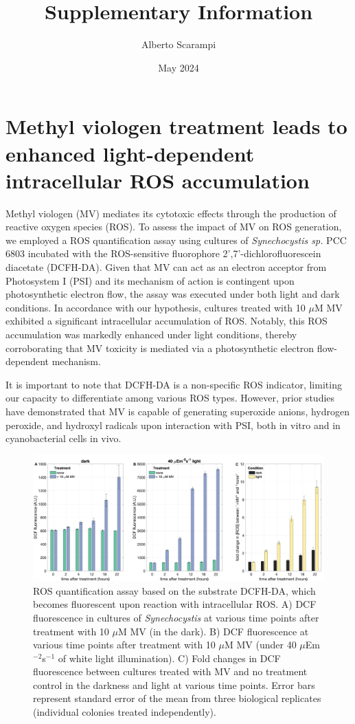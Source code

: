 \documentclass[12pt]{article}
\title{Supplementary Information}
\author{Alberto Scarampi}
\date{May 2024}
\begin{document}
\maketitle

\tableofcontents


\section{Methyl viologen treatment leads to enhanced light-dependent intracellular ROS accumulation}
Methyl viologen (MV) mediates its cytotoxic effects through the production of reactive oxygen species (ROS). To assess the impact of MV on ROS generation, we employed a ROS quantification assay using cultures of \textit{Synechocystis sp.} PCC 6803 incubated with the ROS-sensitive fluorophore 2',7'-dichlorofluorescein diacetate (DCFH-DA). Given that MV can act as an electron acceptor from Photosystem I (PSI) and its mechanism of action is contingent upon photosynthetic electron flow, the assay was executed under both light and dark conditions. 
In accordance with our hypothesis, cultures treated with 10 $\mu$M MV exhibited a significant intracellular accumulation of ROS. Notably, this ROS accumulation was markedly enhanced under light conditions, thereby corroborating that MV toxicity is mediated via a photosynthetic electron flow-dependent mechanism. 

It is important to note that DCFH-DA is a non-specific ROS indicator, limiting our capacity to differentiate among various ROS types. However, prior studies have demonstrated that MV is capable of generating superoxide anions, hydrogen peroxide, and hydroxyl radicals upon interaction with PSI, both in vitro and in cyanobacterial cells in vivo.

\begin{figure}[H]
    \centering
    \includegraphics[width=\hsize]{../Figures/MV_adaptation/MV_ROS_DFCDA_Syn6803.png}
    \caption{ROS quantification assay based on the substrate DCFH-DA, which becomes fluorescent upon reaction with intracellular ROS. A) DCF fluorescence in cultures of \textit{Synechocystis} at various time points after treatment with 10 $\mu$M MV (in the dark). B) DCF fluorescence at various time points after treatment with 10 $\mu$M MV (under 40 $\mu$Em$^{-2}$s$^{-1}$ of white light illumination). C) Fold changes in DCF fluorescence between cultures treated with MV and no treatment control in the darkness and light at various time points. Error bars represent standard error of the mean from three biological replicates (individual colonies treated independently).}
    \label{fig:spectraMV1}
\end{figure}
\end{document}
